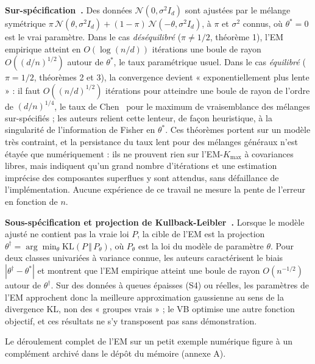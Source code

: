 \textbf{Sur-spécification~\cite{dwivedi2020}.} Des données $\mathcal{N}(0, \sigma^2 I_d)$ sont ajustées par le mélange symétrique $\pi\,\mathcal{N}(\theta, \sigma^2 I_d) + (1-\pi)\,\mathcal{N}(-\theta, \sigma^2 I_d)$, à $\pi$ et $\sigma^2$ connus, où $\theta^* = 0$ est le vrai paramètre. Dans le cas \emph{déséquilibré} ($\pi \neq 1/2$, théorème 1), l'EM empirique atteint en $O(\log(n/d))$ itérations une boule de rayon $O((d/n)^{1/2})$ autour de $\theta^*$, le taux paramétrique usuel. Dans le cas \emph{équilibré} ($\pi = 1/2$, théorèmes 2 et 3), la convergence devient « exponentiellement plus lente » : il faut $O((n/d)^{1/2})$ itérations pour atteindre une boule de rayon de l'ordre de $(d/n)^{1/4}$, le taux de Chen~\cite{chen1995} pour le maximum de vraisemblance des mélanges sur-spécifiés ; les auteurs relient cette lenteur, de façon heuristique, à la singularité de l'information de Fisher en $\theta^*$. Ces théorèmes portent sur un modèle très contraint, et la persistance du taux lent pour des mélanges généraux n'est étayée que numériquement : ils ne prouvent rien sur l'EM-$K_{\max}$ à covariances libres, mais indiquent qu'un grand nombre d'itérations et une estimation imprécise des composantes superflues y sont attendus, sans défaillance de l'implémentation. Aucune expérience de ce travail ne mesure la pente de l'erreur en fonction de $n$.

\textbf{Sous-spécification et projection de Kullback-Leibler~\cite{dwivedi2018}.} Lorsque le modèle ajusté ne contient pas la vraie loi $P$, la cible de l'EM est la projection $\theta^\dagger = \arg\min_{\theta} \mathrm{KL}(P \,\Vert\, P_\theta)$, où $P_\theta$ est la loi du modèle de paramètre $\theta$. Pour deux classes univariées à variance connue, les auteurs caractérisent le biais $|\theta^\dagger - \theta^*|$ et montrent que l'EM empirique atteint une boule de rayon $O(n^{-1/2})$ autour de $\theta^\dagger$. Sur des données à queues épaisses (S4) ou réelles, les paramètres de l'EM approchent donc la meilleure approximation gaussienne au sens de la divergence KL, non des « groupes vrais » ; le VB optimise une autre fonction objectif, et ces résultats ne s'y transposent pas sans démonstration.

Le déroulement complet de l'EM sur un petit exemple numérique figure à un complément archivé dans le dépôt du mémoire (annexe A).

